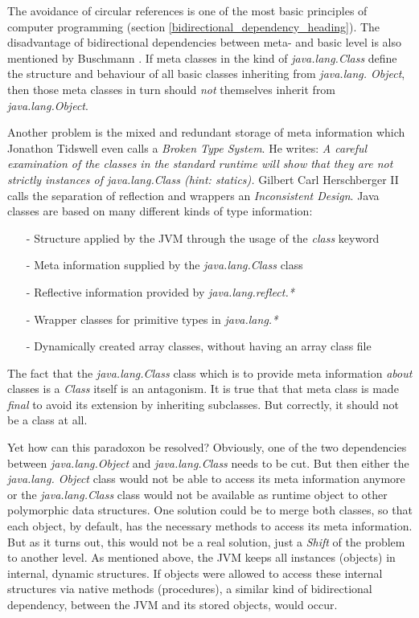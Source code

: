 The avoidance of circular references is one of the most basic principles of
computer programming (section \ref{bidirectional_dependency_heading}). The
disadvantage of bidirectional dependencies between meta- and basic level is
also mentioned by Buschmann \cite{buschmann}. If meta classes in the kind of
\emph{java.lang.Class} define the structure and behaviour of all basic classes
inheriting from \emph{java.lang. Object}, then those meta classes in turn should
\emph{not} themselves inherit from \emph{java.lang.Object}.

Another problem is the mixed and redundant storage of meta information which
Jonathon Tidswell \cite{josgeneral} even calls a \emph{Broken Type System}. He
writes: \textit{A careful examination of the classes in the standard runtime will
show that they are not strictly instances of java.lang.Class (hint: statics).}
Gilbert Carl Herschberger II \cite{josgeneral} calls the separation of
reflection and wrappers an \emph{Inconsistent Design}. Java classes are based
on many different kinds of type information:

\begin{itemize}
    \item[-] Structure applied by the JVM through the usage of the \emph{class} keyword
    \item[-] Meta information supplied by the \emph{java.lang.Class} class
    \item[-] Reflective information provided by \emph{java.lang.reflect.*}
    \item[-] Wrapper classes for primitive types in \emph{java.lang.*}
    \item[-] Dynamically created array classes, without having an array class file
\end{itemize}

The fact that the \emph{java.lang.Class} class which is to provide meta
information \emph{about} classes is a \emph{Class} itself is an antagonism. It
is true that that meta class is made \emph{final} to avoid its extension by
inheriting subclasses. But correctly, it should not be a class at all.

Yet how can this paradoxon be resolved? Obviously, one of the two dependencies
between \emph{java.lang.Object} and \emph{java.lang.Class} needs to be cut. But
then either the \emph{java.lang. Object} class would not be able to access its meta
information anymore or the \emph{java.lang.Class} class would not be available as
runtime object to other polymorphic data structures. One solution could be to
merge both classes, so that each object, by default, has the necessary methods
to access its meta information. But as it turns out, this would not be a real
solution, just a \emph{Shift} of the problem to another level. As mentioned above,
the JVM keeps all instances (objects) in internal, dynamic structures. If objects
were allowed to access these internal structures via native methods (procedures),
a similar kind of bidirectional dependency, between the JVM and its stored objects,
would occur.

